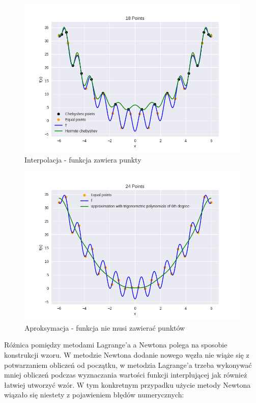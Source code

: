 \documentclass{article}
\begin{document}
\begin{figure}[H]
    \centering
    \includegraphics[width=\textwidth]{img/herm_18.png}
    \caption{Interpolacja - funkcja zawiera punkty}
\end{figure}

\begin{figure}[H]
    \centering
    \includegraphics[width=\textwidth]{img/tripoly_6_24.png}
    \caption{Aproksymacja - funkcja nie musi zawierać punktów}
\end{figure}

Różnica pomiędzy metodami Lagrange'a a Newtona polega na sposobie konstrukcji wzoru. W metodzie Newtona dodanie nowego
węzła nie wiąże się z potwarzaniem obliczeń od początku, w metodzia Lagrange'a trzeba wykonywać mniej obliczeń podczas
wyznaczania wartości funkcji interplującej jak również łatwiej utworzyć wzór. W tym konkretnym przypadku
użycie metody Newtona wiązało się niestety z pojawieniem błędów numerycznych:
\end{document}
